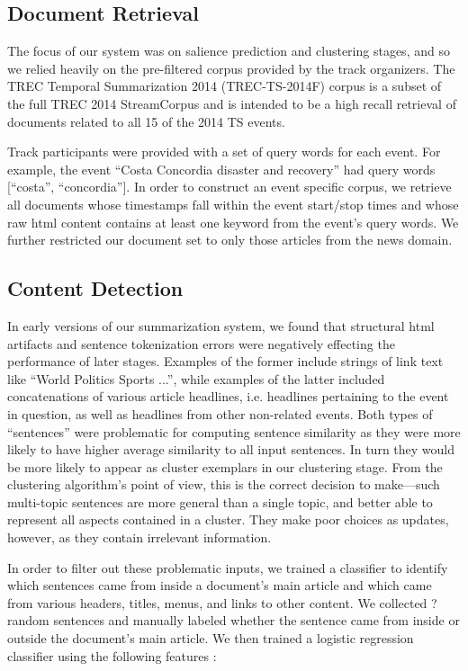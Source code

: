 \documentclass{sig-alternate}
\begin{document}
\subsection{Document Retrieval}\label{subsec:Document Retrieval}

The focus of our system was on salience prediction and clustering stages, and
so we relied heavily on the pre-filtered corpus provided by the track 
organizers. The TREC Temporal Summarization 2014 (TREC-TS-2014F) corpus is
a subset of the full TREC 2014 StreamCorpus and is
intended to be a high recall retrieval of documents related to all 15 of 
the 2014 TS events. 

Track participants were provided with a set of query words for each event.
For example, the event ``Costa Concordia disaster and recovery'' had query
words [``costa'', ``concordia''].
In order to construct an event specific corpus,
we retrieve all documents whose timestamps fall within the event start/stop 
times and whose raw html content contains at least one keyword from the 
event's query words. We further restricted our document set to only those 
articles from the news domain.


\subsection{Content Detection}\label{subsec:Content Detection}

In early versions of our summarization system, we found that structural html
artifacts and sentence tokenization errors
were negatively effecting the performance of later stages. Examples of the 
former include strings of link text like ``World Politics Sports ...'', while
examples of the latter included concatenations of various article headlines,
i.e. headlines pertaining to the event in question, as well as headlines from
other non-related events.
Both types of ``sentences'' were problematic for computing sentence similarity
as they were more likely to have higher average similarity to all input 
sentences. In turn they would be more likely to appear as cluster exemplars
in our clustering stage. From the clustering algorithm's point of view, this
is the correct decision to make---such multi-topic sentences are more general 
than a single topic, and better able to represent all aspects contained in a 
cluster. They make poor choices as updates, however, as they contain 
irrelevant information.

In order to filter out these problematic inputs, we trained a classifier to 
identify which sentences came from inside a document's main article and which
came from various headers, titles, menus, and links to other content. We collected ? random sentences and manually labeled whether the sentence came from
inside or outside the document's main article. We then trained a logistic 
regression classifier using the following features :
\end{document}
